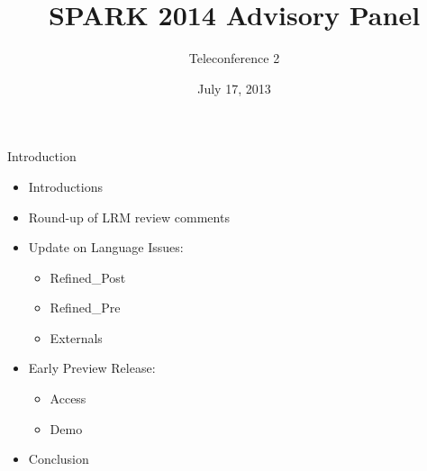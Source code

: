 \documentclass{beamer}
\title{SPARK 2014 Advisory Panel}
\subtitle{Teleconference 2}
\date{July 17, 2013}
\begin{document}
\begin{altrantitle}
\end{altrantitle}

\begin{frame}{Introduction}

  \begin{itemize}

  \item Introductions
  \item Round-up of LRM review comments
  \item Update on Language Issues: 
    \begin{itemize}
    \item Refined\_Post
    \item Refined\_Pre
    \item Externals
    \end{itemize}
  \item Early Preview Release:
    \begin{itemize}
    \item Access
    \item Demo
    \end{itemize}
  \item Conclusion

  \end{itemize}

\end{frame}
\end{document}
